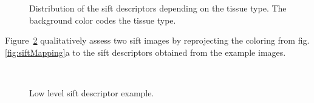 \documentclass[a4paper, 10pt, conference]{llncs}      %
\begin{document}
\begin{figure}[Htbp]
\caption{Distribution of the \acs{sift} descriptors depending on the tissue type. The background color codes the tissue type.}
\label{fig:siftGT}
\end{figure}

Figure~\ref{fig:siftImg} qualitatively assess two \ac{sift} images by reprojecting the coloring from fig.\,\ref{fig:siftMapping}a to the \ac{sift} descriptors obtained from the example images.

\begin{figure}[Htbp]
\centering
{}\,
\,
\,
\\
\caption{Low level sift descriptor example.}
\label{fig:siftImg}
\end{figure}
\end{document}
